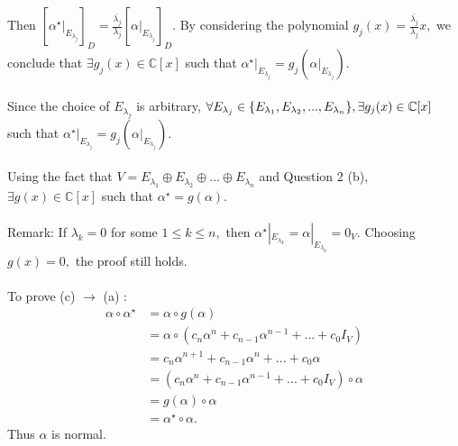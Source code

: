 \documentclass{article}
\begin{document}
Then $[\alpha^\star|_{E_{\lambda_j}}]_D = \frac{\overline{\lambda_j}}{\lambda_j}[\alpha|_{E_{\lambda_j}}]_D$. By considering the polynomial $g_j(x) = \frac{\overline{\lambda_j}}{\lambda_j}x,$ we\\ conclude that $\exists g_j(x) \in \mathbb{C}[x]$ such that $\alpha^\star|_{E_{\lambda_j}} = g_j(\alpha|_{E_{\lambda_j}})$.\\\\
Since the choice of $E_{\lambda_j}$ is arbitrary, $\forall E_{\lambda_j} \in \{E_{\lambda_1}, E_{\lambda_2},...,E_{\lambda_n}\},\\ \exists g_j(x) \in \mathbb{C}[x]$ such that $\alpha^\star|_{E_{\lambda_j}} = g_j(\alpha|_{E_{\lambda_j}})$.\\\\
Using the fact that $V = E_{\lambda_1} \oplus E_{\lambda_2} \oplus ... \oplus E_{\lambda_n}$ and Question 2 (b), $\exists g(x) \in \mathbb{C}[x]$ such that $\alpha^\star = g(\alpha).$\\\\
Remark: If $\lambda_k = 0$ for some $1\leq k\leq n,$ then $\alpha^\star|_{E_{\lambda_k}} = \alpha|_{E_{\lambda_k}} = 0_V.$ Choosing $g(x) = 0,$ the proof still holds.\\\\
To prove (c) $\to$ (a) :
\begin{align*}
\alpha\circ\alpha^\star &= \alpha\circ g(\alpha)\\ &= \alpha\circ(c_n\alpha^n + c_{n-1}\alpha^{n-1} + ... + c_0I_V) \\ &= c_n\alpha^{n+1} + c_{n-1}\alpha^{n} + ... + c_0\alpha \\
&= (c_n\alpha^{n} + c_{n-1}\alpha^{n-1} + ... + c_0I_V)\circ\alpha\\
&= g(\alpha)\circ\alpha\\
&= \alpha^\star \circ \alpha.
\end{align*}
Thus $\alpha$ is normal.
\end{document}
